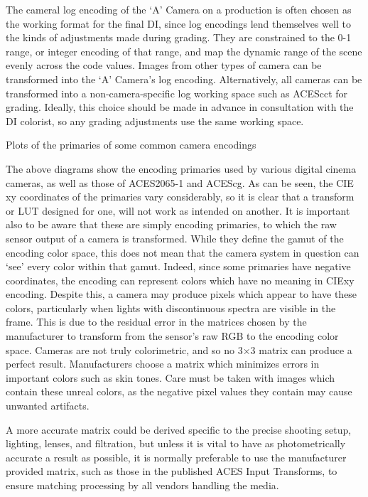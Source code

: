The cameral log encoding of the ‘A’ Camera on a production is often chosen as the working format for the final DI, since log encodings lend themselves well to the kinds of adjustments made during grading. They are constrained to the 0-1 range, or integer encoding of that range, and map the dynamic range of the scene evenly across the code values. Images from other types of camera can be transformed into the ‘A’ Camera’s log encoding. Alternatively, all cameras can be transformed into a non-camera-specific log working space such as ACEScct for grading. Ideally, this choice should be made in advance in consultation with the DI colorist, so any grading adjustments use the same working space.


Plots of the primaries of some common camera encodings

The above diagrams show the encoding primaries used by various digital cinema cameras, as well as those of ACES2065-1 and ACEScg. As can be seen, the CIE xy coordinates of the primaries vary considerably, so it is clear that a transform or LUT designed for one, will not work as intended on another. It is important also to be aware that these are simply encoding primaries, to which the raw sensor output of a camera is transformed. While they define the gamut of the encoding color space, this does not mean that the camera system in question can ‘see’ every color within that gamut. Indeed, since some primaries have negative coordinates, the encoding can represent colors which have no meaning in CIExy encoding. Despite this, a camera may produce pixels which appear to have these colors, particularly when lights with discontinuous spectra are visible in the frame. This is due to the residual error in the matrices chosen by the manufacturer to transform from the sensor’s raw RGB to the encoding color space. Cameras are not truly colorimetric, and so no 3×3 matrix can produce a perfect result. Manufacturers choose a matrix which minimizes errors in important colors such as skin tones. Care must be taken with images which contain these unreal colors, as the negative pixel values they contain may cause unwanted artifacts.

A more accurate matrix could be derived specific to the precise shooting setup, lighting, lenses, and filtration, but unless it is vital to have as photometrically accurate a result as possible, it is normally preferable to use the manufacturer provided matrix, such as those in the published ACES Input Transforms, to ensure matching processing by all vendors handling the media.


